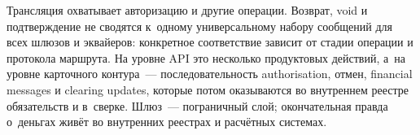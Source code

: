 Трансляция охватывает авторизацию и другие операции. Возврат, void
и подтверждение не сводятся к~одному универсальному набору сообщений
для всех шлюзов и эквайеров: конкретное соответствие зависит
от стадии операции и протокола маршрута. На уровне API
это несколько продуктовых действий, а~на уровне карточного
контура~--- последовательность authorisation, отмен, financial
messages и clearing updates, которые потом оказываются
во внутреннем реестре обязательств и в~сверке. Шлюз~---
пограничный слой; окончательная правда о~деньгах живёт
во внутренних реестрах и расчётных системах.
